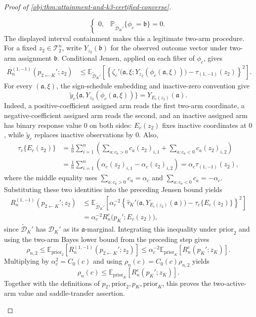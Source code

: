 \begin{proof}[Proof of \cref{obj:thm:attainment-and-k3-certified-converse}]
\begin{enumerate}
\[\begin{cases}
0,&\mathbb P_{\widetilde{\mathcal D}_K'}\{\phi_c=\mathfrak b\}=0.
\end{cases}
\]
The displayed interval containment makes this a legitimate two-arm procedure. For a fixed \(z_2\in\mathcal T_2^n\), write \(Y_{z_2}(\mathfrak b)\) for the observed outcome vector under two-arm assignment \(\mathfrak b\). Conditional Jensen, applied on each fiber of \(\phi_c\), gives
\[
\begin{aligned}
R_n^{(1,-1)}(p_{2\leftarrow K}';z_2)
&\le
\mathbb E_{\widetilde{\mathcal D}_K'}\!\left[
\left\{
\zeta_c'\bigl(\mathfrak a,\xi;Y_{z_2}(\phi_c(\mathfrak a,\xi))\bigr)
-\tau_{(1,-1)}(z_2)
\right\}^2
\right].
\end{aligned}
\]
For every \((\mathfrak a,\xi)\), the sign-schedule embedding and inactive-zero convention give
\[
\widetilde y_c\{\mathfrak a,Y_{z_2}(\phi_c(\mathfrak a,\xi))\}
=
Y_{E_c(z_2)}(\mathfrak a).
\]
Indeed, a positive-coefficient assigned arm reads the first two-arm coordinate, a negative-coefficient assigned arm reads the second, and an inactive assigned arm has binary response value \(0\) on both sides: \(E_c(z_2)\) fixes inactive coordinates at \(0\), while \(\widetilde y_c\) replaces inactive observations by \(0\). Also,
\[
\begin{aligned}
\tau_c\{E_c(z_2)\}
&=\frac1n\sum_{i=1}^n
\left(
\sum_{a:c_a>0}c_a(z_2)_{i,1}
+
\sum_{a:c_a<0}c_a(z_2)_{i,2}
\right)\\
&=\frac1n\sum_{i=1}^n
\left(\alpha_c(z_2)_{i,1}-\alpha_c(z_2)_{i,2}\right)
=\alpha_c\tau_{(1,-1)}(z_2),
\end{aligned}
\]
where the middle equality uses \(\sum_{a:c_a>0}c_a=\alpha_c\) and \(\sum_{a:c_a<0}c_a=-\alpha_c\). Substituting these two identities into the preceding Jensen bound yields
\[
\begin{aligned}
R_n^{(1,-1)}(p_{2\leftarrow K}';z_2)
&\le
\mathbb E_{\widetilde{\mathcal D}_K'}\!\left[
\alpha_c^{-2}
\left\{
\widehat\tau_K'\bigl(\mathfrak a,Y_{E_c(z_2)}(\mathfrak a)\bigr)
-\tau_c\{E_c(z_2)\}
\right\}^2
\right]\\
&=
\alpha_c^{-2}R_n^c\bigl(p_K';E_c(z_2)\bigr),
\end{aligned}
\]
since \(\widetilde{\mathcal D}_K'\) has \(\mathcal D_K'\) as its \(\mathfrak a\)-marginal.
Integrating this inequality under \(\mathrm{prior}_2\) and using the two-arm Bayes lower bound from the preceding step gives
\[
\rho_{n,2}
\le
\mathbb E_{\mathrm{prior}_2}\!\left[
R_n^{(1,-1)}(p_{2\leftarrow K}';z_2)
\right]
\le
\alpha_c^{-2}
\mathbb E_{\mathrm{prior}_K}\!\left[
R_n^c(p_K';z_K)
\right].
\]
Multiplying by \(\alpha_c^2=C_0(c)\) and using \(\rho_n(c)=C_0(c)\rho_{n,2}\) yields
\[
\rho_n(c)
\le
\mathbb E_{\mathrm{prior}_K}\!\left[
R_n^c(p_K';z_K)
\right].
\]
Together with the definitions of \(p_2,\mathrm{prior}_2,p_K,\mathrm{prior}_K\), this proves the two-active-arm value and saddle-transfer assertion.


\end{enumerate}
\end{proof}
